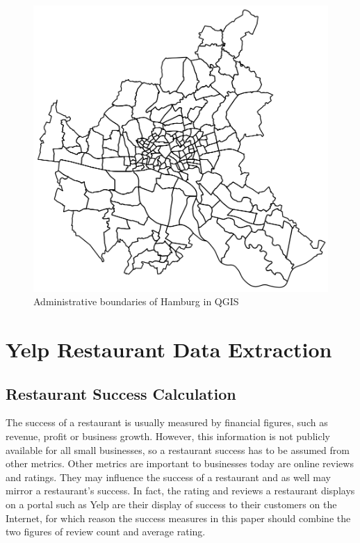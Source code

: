 \documentclass[a4paper, 11pt, oneside]{Thesis}  %
\begin{document}
\begin{figure}[h]
\includegraphics[scale=0.5]{Figures/Hamburg_Administrative_Boundaries.png}
\centering
\caption{Administrative boundaries of Hamburg in QGIS}
\label{fig:administrative_boundaries}
\end{figure}


\section{Yelp Restaurant Data Extraction}



\subsection{Restaurant Success Calculation}

The success of a restaurant is usually measured by financial figures, such as revenue, profit or business growth. However, this information is not publicly available for all small businesses, so a restaurant success has to be assumed from other metrics. Other metrics are important to businesses today are online reviews and ratings. They may influence the success of a restaurant and as well may mirror a restaurant's success. In fact, the rating and reviews a restaurant displays on a portal such as Yelp are their display of success to their customers on the Internet, for which reason the success measures in this paper should combine the two figures of review count and average rating.
\end{document}
